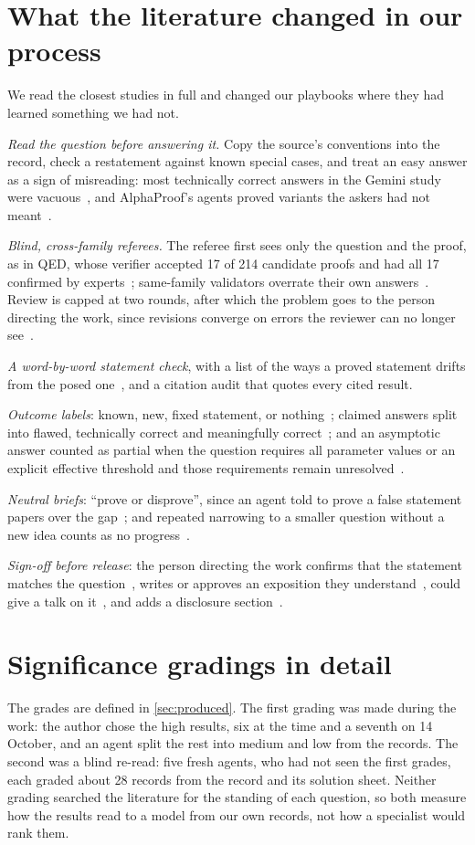 \documentclass[11pt]{amsart}
\newcommand*{\sectionbreak}{\clearpage} %
\begin{document}
\sectionbreak
\section{What the literature changed in our process}\label{app:adopted}

We read the closest studies in full and changed our playbooks where they had
learned something we had not.\@

\emph{Read the question before answering it.} Copy the source's conventions
into the record, check a restatement against known special cases, and treat an
easy answer as a sign of misreading: most technically correct answers in the
Gemini study were vacuous~\cite{feng}, and AlphaProof's agents proved variants
the askers had not meant~\cite{tsoukalas}.\@

\emph{Blind, cross-family referees.} The referee first sees only the question
and the proof, as in QED, whose verifier accepted 17 of 214 candidate proofs
and had all 17 confirmed by experts~\cite{qed}; same-family validators overrate
their own answers~\cite{uq}. Review is capped at two rounds, after which the
problem goes to the person directing the work, since revisions converge on
errors the reviewer can no longer see~\cite{comathematician}.\@

\emph{A word-by-word statement check}, with a list of the ways a proved
statement drifts from the posed one~\cites{qed,kallel}, and a citation audit
that quotes every cited result.\@

\emph{Outcome labels}: known, new, fixed statement, or nothing~\cite{far};
claimed answers split into flawed, technically correct and meaningfully
correct~\cite{feng}; and an asymptotic answer counted as partial when the
question requires all parameter values or an explicit effective threshold and
those requirements remain unresolved~\cite{leduc}.\@

\emph{Neutral briefs}: ``prove or disprove'', since an agent told to prove a
false statement papers over the gap~\cite{woodruff}; and repeated narrowing to
a smaller question without a new idea counts as no
progress~\cite{gowersblog}.\@

\emph{Sign-off before release}: the person directing the work confirms that the
statement matches the question~\cite{kallel}, writes or approves an exposition
they understand~\cite{bloomchanges}, could give a talk on it~\cite{tao-age},
and adds a disclosure section~\cite{leiden}.

\sectionbreak
\section{Significance gradings in detail}\label{app:significance}
The grades are defined in \cref{sec:produced}. The first grading was made
during the work: the author chose the high results, six at the time and a
seventh on 14 October, and an agent split the rest into medium and low from the
records. The second was a blind re-read: five fresh agents, who had not seen
the first grades, each graded about 28 records from the record and its solution
sheet. Neither grading searched the literature for the standing of each
question, so both measure how the results read to a model from our own records,
not how a specialist would rank them.
\end{document}
